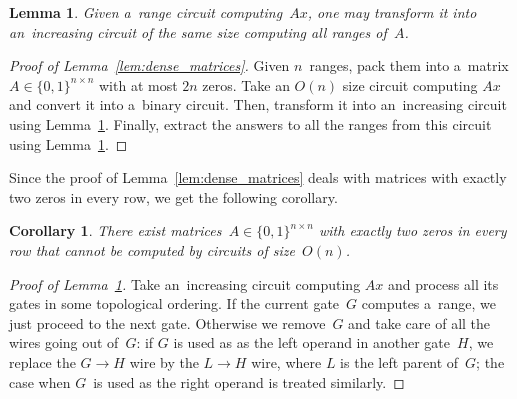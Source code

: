\documentclass[11pt,letterpaper]{article}
\newtheorem{lemma}{Lemma}
\newtheorem{corollary}{Corollary}
\begin{document}
\begin{lemma}\label{lemma:matrixranges}
Given a~range circuit computing~$Ax$, one may transform it into an~increasing circuit of the same size computing all ranges of~$A$.
\end{lemma}

\begin{proof}[Proof of Lemma~\ref{lem:dense_matrices}]
Given $n$~ranges, pack them into a~matrix $A \in \{0,1\}^{n \times n}$ with at most $2n$ zeros. Take an $O(n)$ size circuit computing $Ax$ and convert it into a~binary circuit. Then, transform it into an~increasing circuit using Lemma~\ref{lemma:matrixranges}. Finally, extract the answers to all the ranges from this circuit using Lemma~\ref{lemma:matrixranges}.
\end{proof}

Since the proof of Lemma~\ref{lem:dense_matrices} deals with matrices with exactly two zeros in every row, we get the following corollary.
\begin{corollary}\label{cor:noncommutativetwo}
There exist matrices~$A \in \{0,1\}^{n \times n}$ with exactly two zeros in every row that cannot be computed by circuits of size~$O(n)$.
\end{corollary}

\begin{proof}[Proof of Lemma~\ref{lemma:matrixranges}]
Take an~increasing circuit computing $Ax$ and process all its gates in some topological ordering. If the current gate~$G$ computes a~range, we just proceed to the next gate. Otherwise we remove~$G$ and take care of all the wires going out of~$G$: if $G$ is used as as the left operand in another gate~$H$, we replace the $G \to H$ wire by the $L \to H$ wire, where $L$ is the left parent of~$G$; the case when $G$~is used as the right operand is treated similarly.


\end{proof}
\end{document}
